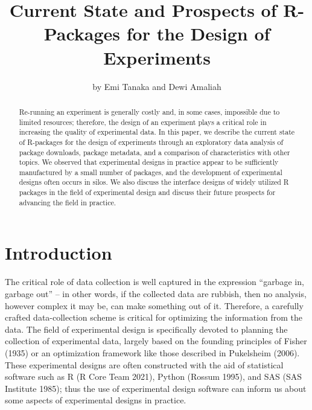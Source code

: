 \title{Current State and Prospects of R-Packages for the Design of Experiments}
\author{by Emi Tanaka and Dewi Amaliah}

\maketitle

\begin{abstract}%
Re-running an experiment is generally costly and, in some cases, impossible due to limited resources; therefore, the design of an experiment plays a critical role in increasing the quality of experimental data. In this paper, we describe the current state of R-packages for the design of experiments through an exploratory data analysis of package downloads, package metadata, and a comparison of characteristics with other topics. We observed that experimental designs in practice appear to be sufficiently manufactured by a small number of packages, and the development of experimental designs often occurs in silos. We also discuss the interface designs of widely utilized R packages in the field of experimental design and discuss their future prospects for advancing the field in practice.
\end{abstract}

\hypertarget{introduction}{%
\section{Introduction}\label{introduction}}

The critical role of data collection is well captured in the expression ``garbage in, garbage out'' -- in other words, if the collected data are rubbish, then no analysis, however complex it may be, can make something out of it. Therefore, a carefully crafted data-collection scheme is critical for optimizing the information from the data. The field of experimental design is specifically devoted to planning the collection of experimental data, largely based on the founding principles of Fisher (1935) or an optimization framework like those described in Pukelsheim (2006). These experimental designs are often constructed with the aid of statistical software such as R (R Core Team 2021), Python (Rossum 1995), and SAS (SAS Institute 1985); thus the use of experimental design software can inform us about some aspects of experimental designs in practice.

